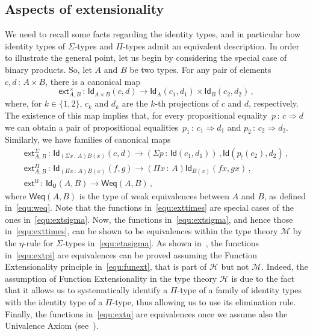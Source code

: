 \documentclass[10pt,a4paper,oneside,reqno]{amsart}
\theoremstyle{mythm}
\theoremstyle{mydef}
\theoremstyle{myrmk}
\newcommand{\co}{\,{:}\,}
\newcommand{\Hint}{\mathcal{H}}
\newcommand{\ext}{\mathsf{ext}}
\newcommand{\Id}{\mathsf{Id}}
\newcommand{\U}{\mathsf{U}}
\begin{document}
\subsection*{Aspects of extensionality} We need to recall some facts regarding the identity types, and in particular how  identity types of $\Sigma$-types and $\Pi$-types admit an equivalent description. In order to illustrate the general point, let us begin by considering the special case of binary products. So, let $A$ and $B$ be two types. For any 
pair of elements $c, d  \co A \times B$, there is a canonical map
\begin{equation}
\label{equ:exttimes}
\ext^{\times}_{A, B}  \co \Id_{A \times B}(c, d) \to \Id_{A}(c_1, d_1) \times \Id_{B}(c_2, d_2) \, , 
\end{equation}
where, for $k \in \{ 1, 2 \}$,  $c_k$ and $d_k$ are the $k$-th projections of $c$ and $d$, respectively. The existence of this map implies that, for every 
propositional equality~$p \co c \Rightarrow d$ we can obtain a pair of propositional equalities~$p_1 \co c_1 \Rightarrow d_1$ and $p_2 \co c_2 \Rightarrow d_2$. Similarly, we
have families of canonical maps
\begin{gather}
\ext^\Sigma_{A,B} \co  \Id_{(\Sigma x \co A)B(x)}(c, d) \to (\Sigma p \co \Id(c_1, d_1)) \, , \Id( p_{!}(c_2), d_2) \, , 
\label{equ:extsigma} \\
\ext^\Pi_{A,B} \co  \Id_{(\Pi x \co A)B(x)}(f, g) \to (\Pi x \co A) \Id_{B(x)}(f x, gx)  \, , 
\label{equ:extpi} \\
\ext^\U \co  \Id_\U(A, B) \to \mathsf{Weq}(A, B) \, ,  \label{equ:extu}
\end{gather}
where $\mathsf{Weq}(A,B)$ is the type of weak equivalences between $A$ and $B$, as defined in~\eqref{equ:weq}.
Note that the functions in~\eqref{equ:exttimes} are special cases of the ones in~\eqref{equ:extsigma}. Now,
the functions in~\eqref{equ:extsigma}, and hence those in~\eqref{equ:exttimes}, can be shown to be 
equivalences within the type theory $\mathcal{M}$ by the $\eta$-rule for $\Sigma$-types in~\eqref{equ:etasigma}. 
As shown in~\cite{VoevodskyV:notts}, the functions in~\eqref{equ:extpi} are equivalences can be proved
assuming the Function 
Extensionality principle in~\eqref{equ:funext}, that is part of $\Hint$ but not $\mathcal{M}$. Indeed, the assumption
of Function Extensionality in the type theory $\mathcal{H}$ is due to the fact that it allows us to systematically
identify a $\Pi$-type of a family of identity types with the identity type of a $\Pi$-type, thus allowing us to use
its elimination rule. Finally, the functions in~\eqref{equ:extu} are equivalences once we assume also the
Univalence Axiom (see~\cite{VoevodskyV:notts}). 
\end{document}
